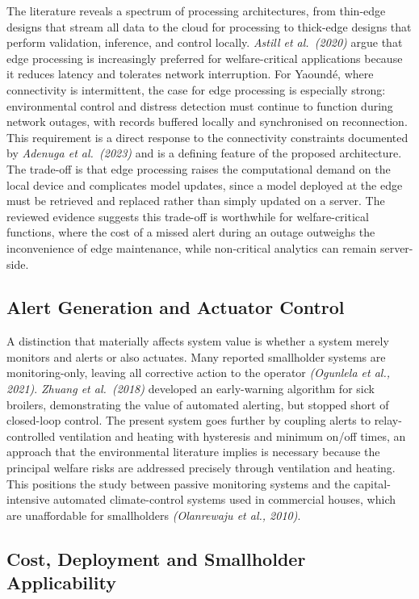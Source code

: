 \documentclass[12pt,a4paper]{report}
\begin{document}
The literature reveals a spectrum of processing architectures, from thin-edge designs that stream all data to the cloud for processing to thick-edge designs that perform validation, inference, and control locally. \textit{Astill et al.\ (2020)} argue that edge processing is increasingly preferred for welfare-critical applications because it reduces latency and tolerates network interruption. For Yaound\'e, where connectivity is intermittent, the case for edge processing is especially strong: environmental control and distress detection must continue to function during network outages, with records buffered locally and synchronised on reconnection. This requirement is a direct response to the connectivity constraints documented by \textit{Adenuga et al.\ (2023)} and is a defining feature of the proposed architecture. The trade-off is that edge processing raises the computational demand on the local device and complicates model updates, since a model deployed at the edge must be retrieved and replaced rather than simply updated on a server. The reviewed evidence suggests this trade-off is worthwhile for welfare-critical functions, where the cost of a missed alert during an outage outweighs the inconvenience of edge maintenance, while non-critical analytics can remain server-side.

\subsection{Alert Generation and Actuator Control}

A distinction that materially affects system value is whether a system merely monitors and alerts or also actuates. Many reported smallholder systems are monitoring-only, leaving all corrective action to the operator \textit{(Ogunlela et al., 2021)}. \textit{Zhuang et al.\ (2018)} developed an early-warning algorithm for sick broilers, demonstrating the value of automated alerting, but stopped short of closed-loop control. The present system goes further by coupling alerts to relay-controlled ventilation and heating with hysteresis and minimum on/off times, an approach that the environmental literature implies is necessary because the principal welfare risks are addressed precisely through ventilation and heating. This positions the study between passive monitoring systems and the capital-intensive automated climate-control systems used in commercial houses, which are unaffordable for smallholders \textit{(Olanrewaju et al., 2010)}.

\subsection{Cost, Deployment and Smallholder Applicability}
\end{document}
